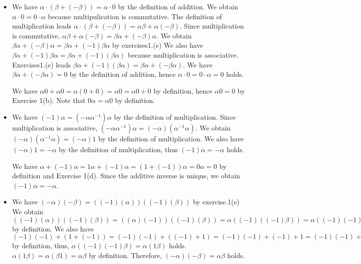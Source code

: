 \documentclass{article}
\begin{document}
\begin{itemize}
  \item[(d)]
    We have $\alpha\cdot(\beta + (-\beta)) = \alpha\cdot0$ by the definition of addition.
    We obtain $\alpha\cdot0 = 0\cdot\alpha$ because multipulication is commutative.
    The definition of multiplication leads $\alpha\cdot(\beta + (-\beta)) = \alpha\beta + \alpha(-\beta)$.
    Since multiplication is commutative, $\alpha\beta + \alpha(-\beta) = \beta\alpha + (-\beta)\alpha$.
    We obtain $\beta\alpha + (-\beta)\alpha = \beta\alpha + (-1)\beta\alpha$ by exercises1.(e)
    We also have $\beta\alpha + (-1)\beta\alpha = \beta\alpha + (-1)(\beta\alpha)$ because multiplication is associative.
    Exercises1.(e) leads $\beta\alpha + (-1)(\beta\alpha) = \beta\alpha + (-\beta\alpha)$.
    We have $\beta\alpha + (-\beta\alpha) = 0$ by the definition of addition,
    hence $\alpha\cdot0 = 0\cdot\alpha = 0$ holds.
    
    {\color{red}
      We have $\alpha 0 + \alpha 0 = \alpha (0 + 0) = \alpha 0 = \alpha 0 + 0$ by definition, hence $\alpha 0 = 0$ by Exercise 1(b).
      Note that $0 \alpha = \alpha 0$ by definition.
    }
    
  \item[(e)]We have $(-1)\alpha = (-\alpha\alpha^{-1})\alpha$ by the definition of multiplication.
    Since multiplication is associative, $(-\alpha\alpha^{-1})\alpha = (-\alpha)(\alpha^{-1}\alpha)$.
    We obtain $(-\alpha)(\alpha^{-1}\alpha) = (-\alpha)1$ by the definition of multiplication.
    We also have $(-\alpha)1 = -\alpha$ by the definition of multiplication, 
    thus $(-1)\alpha = -\alpha$ holds.
    
    {\color{red}
      We have $\alpha + (-1)\alpha = 1\alpha + (-1)\alpha = (1 + (-1))\alpha = 0\alpha = 0$ by definition and Exercise 1(d).
      Since the additive inverse is unique, we obtain $(-1)\alpha = -\alpha$.
    }
    
  \item[(f)]We have $(-\alpha)(-\beta) = ((-1)(\alpha))((-1)(\beta))$ by exercise.1(e)
    We obtain $((-1)(\alpha))((-1)(\beta)) = ((\alpha)(-1))((-1)(\beta)) = \alpha((-1)((-1)\beta)) = \alpha((-1)(-1)\beta)$ by definition.
    We also have $(-1)(-1) + (1 + (-1)) = (-1)(-1) + ((-1) + 1) = (-1)(-1) + (-1) + 1 = (-1)(-1) + (-1)1 + 1 = (-1)(-1 + 1) + 1 = (-1)(1 + (-1)) + 1 = (-1)0 + 1 = 0 + 1 = 1 + 0 = 1$ by definition,
    thus, $\alpha((-1)(-1)\beta) = \alpha(1\beta)$ holds.
    $\alpha(1\beta) = \alpha(\beta1) = \alpha\beta$ by definition.
    Therefore, $(-\alpha)(-\beta) = \alpha\beta$ holds.
    

\end{itemize}
\end{document}
